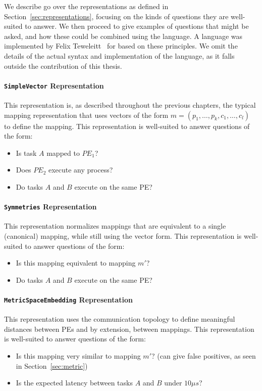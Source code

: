 We describe go over the representations as defined in Section~\ref{sec:representations}, focusing on the kinds of questions they are well-suited to answer.
We then proceed to give examples of questions that might be asked, and how these could be combined using the language.
A language was implemented by Felix Teweleitt~\cite{teweleitt_studienarbeit} for \mocasin based on these principles.
We omit the details of the actual syntax and implementation of the language, as it falls outside the contribution of this thesis.

\paragraph{\texttt{SimpleVector} Representation}
This representation is, as described throughout the previous chapters, the typical mapping representation that uses vectors of the form $ m = (p_1,\ldots,p_k,c_1,\ldots,c_l)$ to define the mapping.
This representation is well-suited to answer questions of the form:
\begin{itemize}
  \item Is task $A$ mapped to $PE_1$?
  \item Does $PE_2$ execute any process?
 \item Do tasks $A$ and $B$ execute on the same \ac{PE}?
\end{itemize}

\paragraph{\texttt{Symmetries} Representation}
This representation normalizes mappings that are equivalent to a single (canonical) mapping, while still using the vector form.
This representation is well-suited to answer questions of the form:
\begin{itemize}
\item Is this mapping equivalent to mapping $m'$?
\item Do tasks $A$ and $B$ execute on the same \ac{PE}?
\end{itemize}

\paragraph{\texttt{MetricSpaceEmbedding} Representation}
This representation uses the communication topology to define meaningful distances between \acp{PE} and by extension, between mappings.
This representation is well-suited to answer questions of the form:
\begin{itemize}
\item Is this mapping very similar to mapping $m'$? (can give false positives, as seen in Section~\ref{sec:metric})
\item Is the expected latency between tasks $A$ and $B$ under $10 \mu s$?
\end{itemize}

